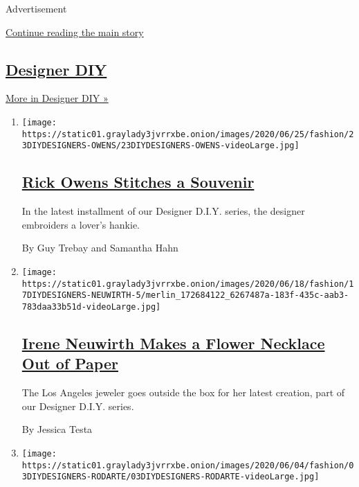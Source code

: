 Advertisement

\protect\hyperlink{after-mid2}{Continue reading the main story}

\hypertarget{designer-diy}{%
\subsection{\texorpdfstring{\href{/issue/fashion/2020/06/19/designer-diy}{Designer
DIY}}{Designer DIY}}\label{designer-diy}}

\href{/issue/fashion/2020/06/19/designer-diy}{More in Designer DIY »}

\begin{enumerate}
\def\labelenumi{\arabic{enumi}.}
\item
  \texttt{[image: https://static01.graylady3jvrrxbe.onion/images/2020/06/25/fashion/23DIYDESIGNERS-OWENS/23DIYDESIGNERS-OWENS-videoLarge.jpg]}

  \hypertarget{rick-owens-stitches-a-souvenir}{%
  \subsection{\texorpdfstring{\href{/2020/06/23/style/DIY-sewing-rick-owens-stitches-a-souvenir.html}{Rick
  Owens Stitches a
  Souvenir}}{Rick Owens Stitches a Souvenir}}\label{rick-owens-stitches-a-souvenir}}

  In the latest installment of our Designer D.I.Y. series, the designer
  embroiders a lover's hankie.

  By Guy Trebay and Samantha Hahn
\item
  \texttt{[image: https://static01.graylady3jvrrxbe.onion/images/2020/06/18/fashion/17DIYDESIGNERS-NEUWIRTH-5/merlin\_172684122\_6267487a-183f-435c-aab3-783daa33b51d-videoLarge.jpg]}

  \hypertarget{irene-neuwirth-makes-a-flower-necklace-out-of-paper}{%
  \subsection{\texorpdfstring{\href{/2020/06/17/style/paper-flower-necklace-DIY.html}{Irene
  Neuwirth Makes a Flower Necklace Out of
  Paper}}{Irene Neuwirth Makes a Flower Necklace Out of Paper}}\label{irene-neuwirth-makes-a-flower-necklace-out-of-paper}}

  The Los Angeles jeweler goes outside the box for her latest creation,
  part of our Designer D.I.Y. series.

  By Jessica Testa
\item
  \texttt{[image: https://static01.graylady3jvrrxbe.onion/images/2020/06/04/fashion/03DIYDESIGNERS-RODARTE/03DIYDESIGNERS-RODARTE-videoLarge.jpg]}


\end{enumerate}

